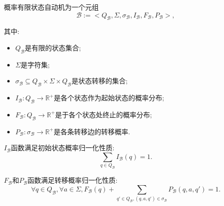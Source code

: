         \begin{definition}
            \label{def.pfsa}
            概率有限状态自动机为一个元组
            \begin{equation}
                \mathcal{B} := <Q_{\mathcal{B}}, \Sigma, \sigma_{\mathcal{B}}, I_{\mathcal{B}}, F_{\mathcal{B}}, P_{\mathcal{B}}>,
            \end{equation}
            
            其中:
            \begin{itemize}
                \item $Q_{\mathcal{B}}$是有限的状态集合;
                
                \item $\Sigma$是字符集;
                
                \item $\sigma_{\mathcal{B}} \subseteq Q_{\mathcal{B}} \times \Sigma \times Q_{\mathcal{B}}$是状态转移的集合;
                
                \item $I_{\mathcal{B}} : Q_{\mathcal{B}} \to \mathbb{R}^{+}$是各个状态作为起始状态的概率分布;
                
                \item $F_{\mathcal{B}}: Q_{\mathcal{B}} \to \mathbb{R}^{+}$是于各个状态处终止的概率分布;
                
                \item $P_{\mathcal{B}} : \sigma_{\mathcal{B}} \to \mathbb{R}^{+}$是各条转移边的转移概率.
            \end{itemize}
            
            $I_{\mathcal{B}}$函数满足初始状态概率归一化性质:
            \begin{equation}
                \label{eq:pfsa_init_normal}
                \sum_{q \in Q_{\mathcal{B}}} I_{\mathcal{B}}(q) = 1.
            \end{equation}
            
            $F_{\mathcal{B}}$和$P_{\mathcal{B}}$函数满足转移概率归一化性质:
            \begin{equation}
                \label{eq:pfsa_trans_normal}
                \forall q \in Q_{\mathcal{B}}, \forall a \in \Sigma, F_{\mathcal{B}}(q) + \sum_{q' \in Q_{\mathcal{B}}, (q,a,q') \in \sigma_{\mathcal{B}}} P_{\mathcal{B}}(q,a,q') = 1.
            \end{equation}
        \end{definition}
        
